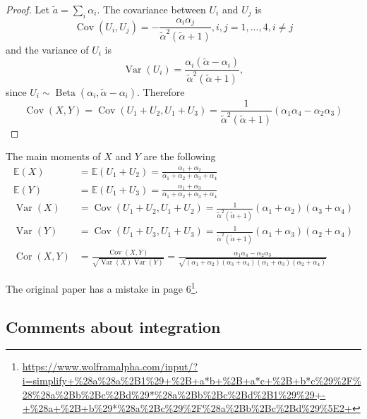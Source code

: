 \documentclass[a4paper, notitlepage, 11pt]{article}
\newcommand{\ev}{\mathbb{E}}
\newcommand{\var}{\operatorname{Var}}
\newcommand{\cor}{\operatorname{Cor}}
\newcommand{\cov}{\operatorname{Cov}}
\theoremstyle{definition}
\theoremstyle{remark}
\begin{document}
\begin{proof}

  Let $\tilde{a} = \sum_i \alpha_i$. The covariance between $U_i$ and $U_j$ is \cite[]{lin2016dirichlet} 
\begin{equation}
  \cov(U_i, U_j) = - \frac{\alpha_i\alpha_j}{\tilde{\alpha}^2(\tilde{\alpha}+1)}, i,j = 1,...,4, i \neq j
\end{equation} 
and the variance of $U_i$ is 
\begin{equation}
  \var(U_i) = \frac{\alpha_i(\tilde{\alpha}-\alpha_i)}{\tilde{\alpha}^2(\tilde{\alpha}+1)},
\end{equation}
since $U_i \sim \operatorname{Beta}(\alpha_i, \tilde{\alpha} -\alpha_i)$.
Therefore 
\begin{equation}
  \cov(X,Y) = \cov(U_1+U_2, U_1+U_3) = \frac{1}{\tilde{\alpha}^2(\tilde{\alpha}+1)}(\alpha_1\alpha_4 - \alpha_2\alpha_3)
\end{equation}
  
\end{proof}

The main moments of $X$ and $Y$ are the following 
\begin{align*}
    \ev(X) &= \ev(U_1 + U_2) = \frac{\alpha_1+\alpha_2}{\alpha_1+\alpha_2+\alpha_3+\alpha_4} \\
    \ev(Y) &= \ev(U_1 + U_3) = \frac{\alpha_1+\alpha_3}{\alpha_1+\alpha_2+\alpha_3+\alpha_4} \\
    \var(X) &= \cov(U_1+U_2, U_1+U_2) = \frac{1}{\tilde{\alpha}^2(\tilde{\alpha}+1)}(\alpha_1+\alpha_2)(\alpha_3 + \alpha_4) \\
    \var(Y) &= \cov(U_1+U_3, U_1+U_3) = \frac{1}{\tilde{\alpha}^2(\tilde{\alpha}+1)}(\alpha_1+\alpha_3)(\alpha_2 + \alpha_4)  \\  
    \cor(X,Y) &= \frac{\cov(X,Y)}{\sqrt{\var(X)\var(Y)}} = \frac{\alpha_1\alpha_4 - \alpha_2\alpha_3}{\sqrt{(\alpha_1+\alpha_2)(\alpha_3+\alpha_4)(\alpha_1+\alpha_3)(\alpha_2+\alpha_4)}}
\end{align*}

The original paper has a mistake in page
6\footnote{\url{https://www.wolframalpha.com/input/?i=simplify+\%28a\%28a\%2B1\%29+\%2B+a*b+\%2B+a*c+\%2B+b*c\%29\%2F\%28\%28a\%2Bb\%2Bc\%2Bd\%29*\%28a\%2Bb\%2Bc\%2Bd\%2B1\%29\%29+-+\%28a+\%2B+b\%29*\%28a\%2Bc\%29\%2F\%28a\%2Bb\%2Bc\%2Bd\%29\%5E2+}}.

\subsection{Comments about integration}
\end{document}
